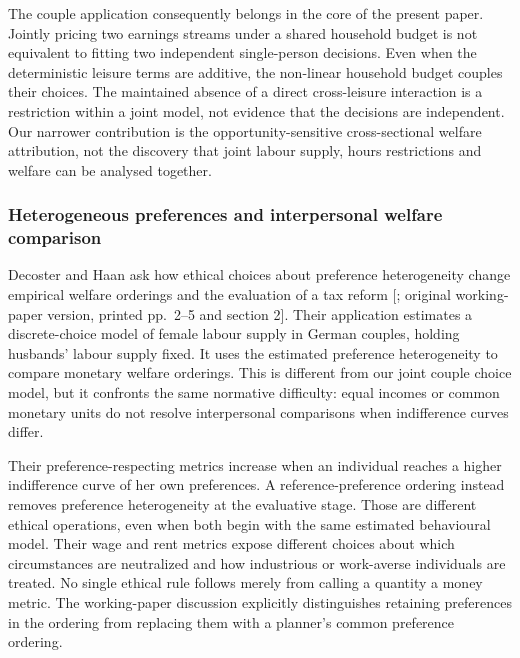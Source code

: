 \documentclass[11pt,a4paper]{article}
\begin{document}
The couple application consequently belongs in the core of the present paper. Jointly pricing two earnings streams under a shared household budget is not equivalent to fitting two independent single-person decisions. Even when the deterministic leisure terms are additive, the non-linear household budget couples their choices. The maintained absence of a direct cross-leisure interaction is a restriction within a joint model, not evidence that the decisions are independent. Our narrower contribution is the opportunity-sensitive cross-sectional welfare attribution, not the discovery that joint labour supply, hours restrictions and welfare can be analysed together.

\subsubsection{Heterogeneous preferences and interpersonal welfare comparison}\label{heterogeneous-preferences-and-interpersonal-welfare-comparison}

Decoster and Haan ask how ethical choices about preference heterogeneity change empirical welfare orderings and the evaluation of a tax reform {[}\citet{decosterhaan2015}; original working-paper version, printed pp.~2--5 and section 2{]}. Their application estimates a discrete-choice model of female labour supply in German couples, holding husbands' labour supply fixed. It uses the estimated preference heterogeneity to compare monetary welfare orderings. This is different from our joint couple choice model, but it confronts the same normative difficulty: equal incomes or common monetary units do not resolve interpersonal comparisons when indifference curves differ.

Their preference-respecting metrics increase when an individual reaches a higher indifference curve of her own preferences. A reference-preference ordering instead removes preference heterogeneity at the evaluative stage. Those are different ethical operations, even when both begin with the same estimated behavioural model. Their wage and rent metrics expose different choices about which circumstances are neutralized and how industrious or work-averse individuals are treated. No single ethical rule follows merely from calling a quantity a money metric. The working-paper discussion explicitly distinguishes retaining preferences in the ordering from replacing them with a planner's common preference ordering.
\end{document}
